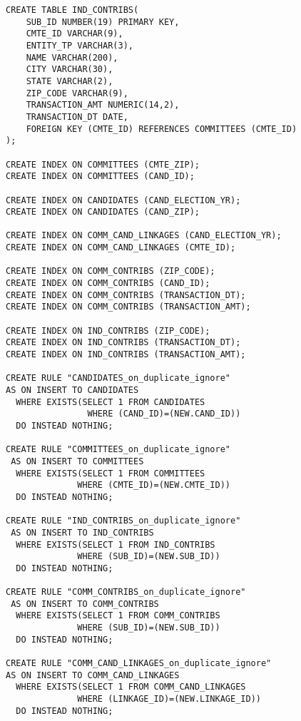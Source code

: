 \documentclass[10pt,a4paper]{article}
\begin{document}
\begin{lstlisting}[style=BashInputStyle]
CREATE TABLE IND_CONTRIBS(
    SUB_ID NUMBER(19) PRIMARY KEY,
    CMTE_ID VARCHAR(9),
    ENTITY_TP VARCHAR(3),
    NAME VARCHAR(200),
    CITY VARCHAR(30),
    STATE VARCHAR(2),
    ZIP_CODE VARCHAR(9),
    TRANSACTION_AMT NUMERIC(14,2),
    TRANSACTION_DT DATE,
    FOREIGN KEY (CMTE_ID) REFERENCES COMMITTEES (CMTE_ID)
);

CREATE INDEX ON COMMITTEES (CMTE_ZIP);
CREATE INDEX ON COMMITTEES (CAND_ID);

CREATE INDEX ON CANDIDATES (CAND_ELECTION_YR);
CREATE INDEX ON CANDIDATES (CAND_ZIP);

CREATE INDEX ON COMM_CAND_LINKAGES (CAND_ELECTION_YR);
CREATE INDEX ON COMM_CAND_LINKAGES (CMTE_ID);

CREATE INDEX ON COMM_CONTRIBS (ZIP_CODE);
CREATE INDEX ON COMM_CONTRIBS (CAND_ID);
CREATE INDEX ON COMM_CONTRIBS (TRANSACTION_DT);
CREATE INDEX ON COMM_CONTRIBS (TRANSACTION_AMT);

CREATE INDEX ON IND_CONTRIBS (ZIP_CODE);
CREATE INDEX ON IND_CONTRIBS (TRANSACTION_DT);
CREATE INDEX ON IND_CONTRIBS (TRANSACTION_AMT);

CREATE RULE "CANDIDATES_on_duplicate_ignore" 
AS ON INSERT TO CANDIDATES
  WHERE EXISTS(SELECT 1 FROM CANDIDATES
                WHERE (CAND_ID)=(NEW.CAND_ID))
  DO INSTEAD NOTHING;

CREATE RULE "COMMITTEES_on_duplicate_ignore"
 AS ON INSERT TO COMMITTEES
  WHERE EXISTS(SELECT 1 FROM COMMITTEES
              WHERE (CMTE_ID)=(NEW.CMTE_ID))
  DO INSTEAD NOTHING;

CREATE RULE "IND_CONTRIBS_on_duplicate_ignore"
 AS ON INSERT TO IND_CONTRIBS
  WHERE EXISTS(SELECT 1 FROM IND_CONTRIBS
              WHERE (SUB_ID)=(NEW.SUB_ID))
  DO INSTEAD NOTHING;

CREATE RULE "COMM_CONTRIBS_on_duplicate_ignore"
 AS ON INSERT TO COMM_CONTRIBS
  WHERE EXISTS(SELECT 1 FROM COMM_CONTRIBS
              WHERE (SUB_ID)=(NEW.SUB_ID))
  DO INSTEAD NOTHING;

CREATE RULE "COMM_CAND_LINKAGES_on_duplicate_ignore" 
AS ON INSERT TO COMM_CAND_LINKAGES
  WHERE EXISTS(SELECT 1 FROM COMM_CAND_LINKAGES
              WHERE (LINKAGE_ID)=(NEW.LINKAGE_ID))
  DO INSTEAD NOTHING;

\end{lstlisting}
\end{document}
